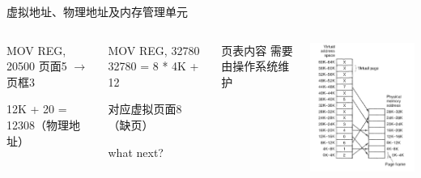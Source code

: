 \documentclass[xcolor=svgnames]{beamer}
\begin{document}
\begin{CJK*}{UTF8}{gbsn}
\begin{frame}{虚拟地址、物理地址及内存管理单元}
\begin{columns}
\begin{block}{MOV REG, 20500}
页面5 $\rightarrow$ 页框3

12K + 20 = 12308（物理地址）
\end{block}
\begin{block}{MOV REG, 32780}
32780 = 8 * 4K + 12

对应虚拟页面8（缺页）

\alert{what next?}
\end{block}
\begin{block}{页表内容}
需要由操作系统维护
\end{block}
\includegraphics[width=1.0\textwidth]{vm.png}
\end{columns}%
\end{frame}


\end{CJK*}
\end{document}
